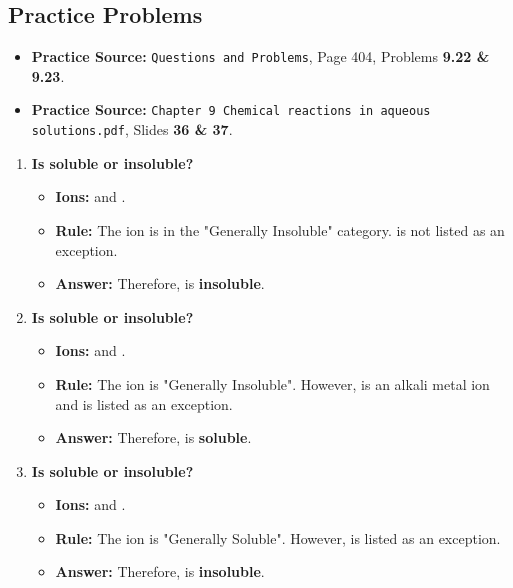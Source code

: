 \documentclass{article}
\begin{document}
\subsection*{Practice Problems}
\begin{itemize}[itemsep=5pt]
    \item \textbf{Practice Source:} \texttt{Questions and Problems}, Page 404, Problems \textbf{9.22 \& 9.23}.
    \item \textbf{Practice Source:} \texttt{Chapter 9 Chemical reactions in aqueous solutions.pdf}, Slides \textbf{36 \& 37}.
\end{itemize}
\begin{enumerate}[itemsep=5pt]
    \item \textbf{Is  soluble or insoluble?}
    \begin{itemize}
        \item \textbf{Ions:}  and .
        \item \textbf{Rule:} The  ion is in the "Generally Insoluble" category.  is not listed as an exception.
        \item \textbf{Answer:} Therefore,  is \textbf{insoluble}.
    \end{itemize}
    \item \textbf{Is  soluble or insoluble?}
    \begin{itemize}
        \item \textbf{Ions:}  and .
        \item \textbf{Rule:} The  ion is "Generally Insoluble". However,  is an alkali metal ion and is listed as an exception.
        \item \textbf{Answer:} Therefore,  is \textbf{soluble}.
    \end{itemize}
    \item \textbf{Is  soluble or insoluble?}
    \begin{itemize}
        \item \textbf{Ions:}  and .
        \item \textbf{Rule:} The  ion is "Generally Soluble". However,  is listed as an exception.
        \item \textbf{Answer:} Therefore,  is \textbf{insoluble}.
    \end{itemize}
\end{enumerate}

\newpage
\end{document}
